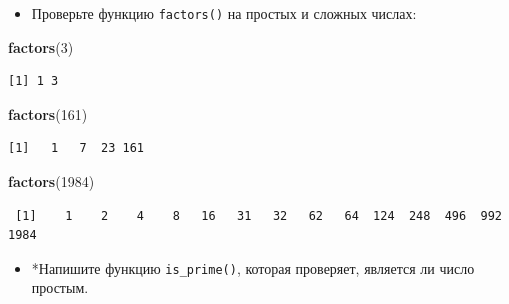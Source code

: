 \documentclass[
]{book}
\newenvironment{Shaded}{\begin{snugshade}}{\end{snugshade}}
\newcommand{\ControlFlowTok}[1]{\textcolor[rgb]{0.13,0.29,0.53}{\textbf{#1}}}
\newcommand{\DecValTok}[1]{\textcolor[rgb]{0.00,0.00,0.81}{#1}}
\newcommand{\KeywordTok}[1]{\textcolor[rgb]{0.13,0.29,0.53}{\textbf{#1}}}
\newcommand{\NormalTok}[1]{#1}
\newcommand{\OperatorTok}[1]{\textcolor[rgb]{0.81,0.36,0.00}{\textbf{#1}}}
\newcommand{\StringTok}[1]{\textcolor[rgb]{0.31,0.60,0.02}{#1}}
\providecommand{\tightlist}{%
  \setlength{\itemsep}{0pt}\setlength{\parskip}{0pt}}
\begin{document}
\begin{Shaded}
\end{Shaded}

\begin{itemize}
\tightlist
\item
  Проверьте функцию \texttt{factors()} на простых и сложных числах:
\end{itemize}

\begin{Shaded}
\begin{Highlighting}[]
\KeywordTok{factors}\NormalTok{(}\DecValTok{3}\NormalTok{)}
\end{Highlighting}
\end{Shaded}

\begin{verbatim}
[1] 1 3
\end{verbatim}

\begin{Shaded}
\begin{Highlighting}[]
\KeywordTok{factors}\NormalTok{(}\DecValTok{161}\NormalTok{)}
\end{Highlighting}
\end{Shaded}

\begin{verbatim}
[1]   1   7  23 161
\end{verbatim}

\begin{Shaded}
\begin{Highlighting}[]
\KeywordTok{factors}\NormalTok{(}\DecValTok{1984}\NormalTok{)}
\end{Highlighting}
\end{Shaded}

\begin{verbatim}
 [1]    1    2    4    8   16   31   32   62   64  124  248  496  992 1984
\end{verbatim}

\begin{itemize}
\tightlist
\item
  *Напишите функцию \texttt{is\_prime()}, которая проверяет, является ли число простым.
\end{itemize}
\end{document}
